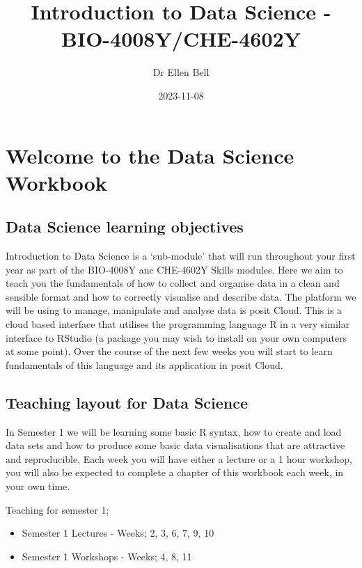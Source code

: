 \documentclass[
]{book}
\title{Introduction to Data Science - BIO-4008Y/CHE-4602Y}
\author{Dr Ellen Bell}
\date{2023-11-08}
\providecommand{\tightlist}{%
  \setlength{\itemsep}{0pt}\setlength{\parskip}{0pt}}
\begin{document}
\maketitle

{
\setcounter{tocdepth}{1}
\tableofcontents
}
\hypertarget{welcome-to-the-data-science-workbook}{%
\chapter{Welcome to the Data Science Workbook}\label{welcome-to-the-data-science-workbook}}

\hypertarget{data-science-learning-objectives}{%
\section{Data Science learning objectives}\label{data-science-learning-objectives}}

Introduction to Data Science is a `sub-module' that will run throughout your first year as part of the BIO-4008Y anc CHE-4602Y Skills modules. Here we aim to teach you the fundamentals of how to collect and organise data in a clean and sensible format and how to correctly visualise and describe data. The platform we will be using to manage, manipulate and analyse data is posit Cloud. This is a cloud based interface that utilises the programming language R in a very similar interface to RStudio (a package you may wish to install on your own computers at some point). Over the course of the next few weeks you will start to learn fundamentals of this language and its application in posit Cloud.

\hypertarget{teaching-layout-for-data-science}{%
\section{Teaching layout for Data Science}\label{teaching-layout-for-data-science}}

In Semester 1 we will be learning some basic R syntax, how to create and load data sets and how to produce some basic data visualisations that are attractive and reproducible. Each week you will have either a lecture or a 1 hour workshop, you will also be expected to complete a chapter of this workbook each week, in your own time.

Teaching for semester 1;

\begin{itemize}
\tightlist
\item
  Semester 1 Lectures - Weeks; 2, 3, 6, 7, 9, 10
\item
  Semester 1 Workshops - Weeks; 4, 8, 11
\end{itemize}
\end{document}
